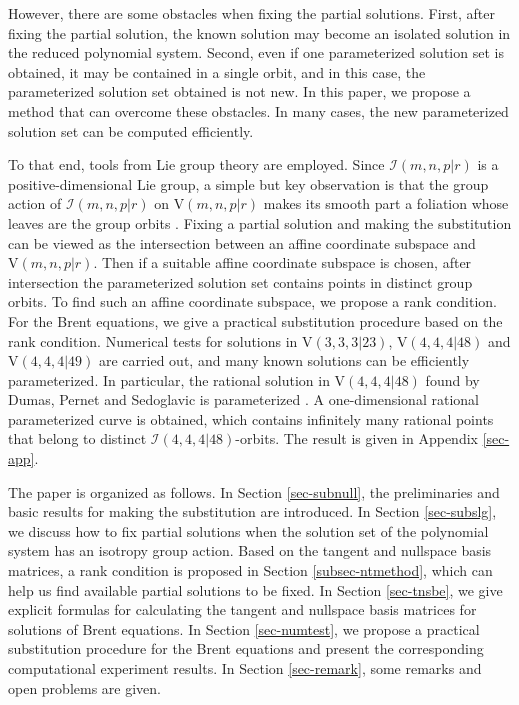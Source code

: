 \documentclass[reqno]{amsart}
\theoremstyle{definition}
\numberwithin{equation}{section}
\theoremstyle{remark}
\newcounter{condition}
\begin{document}
However, there are some obstacles when fixing the partial solutions. First, after fixing the partial solution, the known solution may become an isolated solution in the reduced polynomial system. Second, even if one parameterized solution set is obtained, it may be contained in a single orbit, and in this case, the parameterized solution set obtained is not new. In this paper, we propose a method that can overcome these obstacles. In many cases, the new parameterized solution set can be computed efficiently.

To that end, tools from Lie group theory \cite{olver93li,olver95e,olver99c,olver03mf} are employed. Since $\mathcal{I}(m,n,p|r)$ is a positive-dimensional Lie group, a simple but key observation is that the group action of $\mathcal{I}(m,n,p|r)$ on $\mathrm{V}(m,n,p|r)$ makes its smooth part a foliation whose leaves are the group orbits \cite{lawson74fol,lee12smooth}. Fixing a partial solution and making the substitution can be viewed as the intersection between an affine coordinate subspace and $\mathrm{V}(m,n,p|r)$. Then if a suitable affine coordinate subspace is chosen, after intersection the parameterized solution set contains points in distinct group orbits. To find such an affine coordinate subspace, we propose a rank condition. For the Brent equations, we give a practical substitution procedure based on the rank condition. Numerical tests for solutions in $\mathrm{V}(3,3,3|23)$, $\mathrm{V}(4,4,4|48)$ and $\mathrm{V}(4,4,4|49)$ are carried out, and many known solutions can be efficiently parameterized. In particular, the rational solution in $\mathrm{V}(4,4,4|48)$ found by Dumas, Pernet and Sedoglavic is parameterized \cite{dumas25}. A one-dimensional rational parameterized curve is obtained, which contains infinitely many rational points that belong to distinct $\mathcal{I}(4,4,4|48)$-orbits. The result is given in Appendix \ref{sec-app}.

The paper is organized as follows. In Section \ref{sec-subnull}, the preliminaries and basic results for making the substitution are introduced. In Section \ref{sec-subslg}, we discuss how to fix partial solutions when the solution set of the polynomial system has an isotropy group action. Based on the tangent and nullspace basis matrices, a rank condition is proposed in Section \ref{subsec-ntmethod}, which can help us find available partial solutions to be fixed. In Section \ref{sec-tnsbe}, we give explicit formulas for calculating the tangent and nullspace basis matrices for solutions of Brent equations. In Section \ref{sec-numtest}, we propose a practical substitution procedure for the Brent equations and present the corresponding computational experiment results. In Section \ref{sec-remark}, some remarks and open problems are given.
\end{document}
